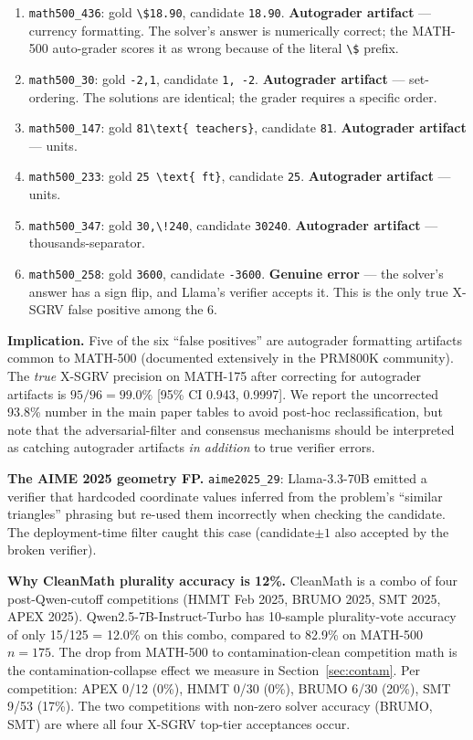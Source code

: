 \documentclass{article}
\begin{document}
\begin{enumerate}[leftmargin=*,itemsep=1pt]
\item \texttt{math500\_436}: gold \texttt{\textbackslash\$18.90}, candidate \texttt{18.90}. \textbf{Autograder artifact} --- currency formatting. The solver's answer is numerically correct; the MATH-500 auto-grader scores it as wrong because of the literal \texttt{\textbackslash\$} prefix.
\item \texttt{math500\_30}: gold \texttt{-2,1}, candidate \texttt{1, -2}. \textbf{Autograder artifact} --- set-ordering. The solutions are identical; the grader requires a specific order.
\item \texttt{math500\_147}: gold \texttt{81\textbackslash text\{\ teachers\}}, candidate \texttt{81}. \textbf{Autograder artifact} --- units.
\item \texttt{math500\_233}: gold \texttt{25 \textbackslash text\{\ ft\}}, candidate \texttt{25}. \textbf{Autograder artifact} --- units.
\item \texttt{math500\_347}: gold \texttt{30,\textbackslash!240}, candidate \texttt{30240}. \textbf{Autograder artifact} --- thousands-separator.
\item \texttt{math500\_258}: gold \texttt{3600}, candidate \texttt{-3600}. \textbf{Genuine error} --- the solver's answer has a sign flip, and Llama's verifier accepts it. This is the only true X-SGRV false positive among the 6.
\end{enumerate}

\textbf{Implication.} Five of the six ``false positives'' are autograder formatting artifacts common to MATH-500 (documented extensively in the PRM800K community). The \emph{true} X-SGRV precision on MATH-175 after correcting for autograder artifacts is $95/96 = 99.0\%$ [95\% CI 0.943, 0.9997]. We report the uncorrected 93.8\% number in the main paper tables to avoid post-hoc reclassification, but note that the adversarial-filter and consensus mechanisms should be interpreted as catching autograder artifacts \emph{in addition} to true verifier errors.

\textbf{The AIME 2025 geometry FP.} \texttt{aime2025\_29}: Llama-3.3-70B emitted a verifier that hardcoded coordinate values inferred from the problem's ``similar triangles'' phrasing but re-used them incorrectly when checking the candidate. The deployment-time filter caught this case (candidate$\pm 1$ also accepted by the broken verifier).

\textbf{Why CleanMath plurality accuracy is 12\%.} CleanMath is a combo of four post-Qwen-cutoff competitions (HMMT Feb 2025, BRUMO 2025, SMT 2025, APEX 2025). Qwen2.5-7B-Instruct-Turbo has 10-sample plurality-vote accuracy of only 15/125 = 12.0\% on this combo, compared to 82.9\% on MATH-500 $n{=}175$. The drop from MATH-500 to contamination-clean competition math is the contamination-collapse effect we measure in Section~\ref{sec:contam}. Per competition: APEX 0/12 (0\%), HMMT 0/30 (0\%), BRUMO 6/30 (20\%), SMT 9/53 (17\%). The two competitions with non-zero solver accuracy (BRUMO, SMT) are where all four X-SGRV top-tier acceptances occur.
\end{document}
